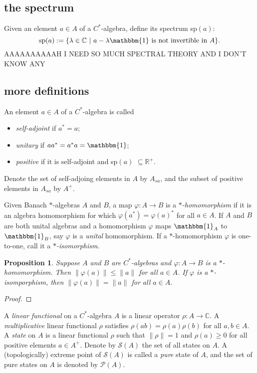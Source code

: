\documentclass[12pt,a4paper]{amsart}
\theoremstyle{plain}
\newtheorem{prop}{Proposition}
\theoremstyle{definition}
\newcommand{\1}{\mathbbm{1}}
\newcommand{\C}{\mathbb{C}}
\newcommand{\R}{\mathbb{R}}
\renewcommand{\phi}{\varphi}
\renewcommand{\S}[1]{\mathscr{S}(#1)}
\renewcommand{\P}[1]{\mathscr{P}(#1)}
\begin{document}
\subsection{the spectrum}
Given an element $a \in A$ of a $C^\ast$-algebra, define its spectrum sp$(a)$:
\[
	\mbox{sp}(a):=\{\lambda\in \C ~|~ a-\lambda \1 \mbox{ is not invertible in }A\}.
\]
AAAAAAAAAAH I NEED SO MUCH SPECTRAL THEORY AND I DON'T KNOW ANY

\subsection{more definitions}
An element $a\in A$ of a $C^\ast$-algebra is called  %
\begin{itemize}
	\item \emph{self-adjoint} if $a^\ast=a$;
	\item \emph{unitary} if $aa^\ast=a^\ast a = \1$;
	\item \emph{positive} if it is self-adjoint and sp$(a)$ $\subseteq \R^+$.
\end{itemize}
Denote the set of self-adjoing elements in $A$ by $A_{sa}$, and the subset of positive 
elements in $A_{sa}$ by $A^+$.


	Given Banach $\ast$-algebras $A$ and $B$, a map $\phi:A\to B$ is a \emph{$\ast$-homomorphism} 
	if it is an algebra homomorphism for which $\phi(a^\ast) = \phi(a)^\ast$ for all $a \in A$.
	If $A$ and $B$ are both unital algebras and a homomorphism $\phi$ maps $\1_A$ to $\1_B$, 
	say $\phi$ is a \emph{unital} homomorphism.   
	If a $\ast$-homomorphism $\phi$ is one-to-one, call it a \emph{$\ast$-isomorphism}.

\begin{prop}
	Suppose $A$ and $B$ are $C^\ast$-algebras and $\phi:A\to B$ is a $\ast$-homomorphism. Then
	$\|\phi(a)\| \leq \|a\|$ for all $a \in A$. If $\phi$ is a $\ast$-isomporphism, then
	$\|\phi(a)\| = \|a\|$ for all $a \in A$.
\end{prop}
\begin{proof}
	
\end{proof}



	A \emph{linear functional} on a $C^\ast$-algebra $A$ is a linear operator $\rho:A \to \C$.
	A \emph{multiplicative} linear functional $\rho$ satisfies $\rho(ab) =\rho(a)\rho(b)$ 
	for all $a,b\in A$.
	A \emph{state} on $A$ is a linear functional $\rho$ such that $\|\rho\|=1$ and 
	$\rho (a) \geq 0$  for all positive elements $a \in A^+$. 
	Denote by $\S{A}$ the set of all states on $A$.
	A (topologically) extreme point of $\S{A}$ is called a \emph{pure} state of $A$, 
	and the set of pure states on $A$ is denoted by $\P{A}$.
\end{document}
